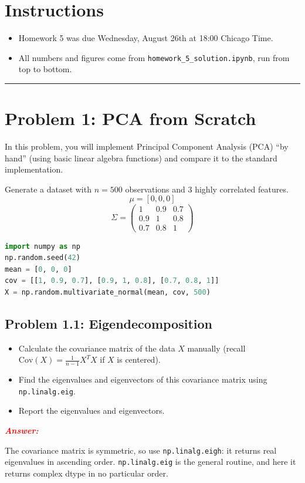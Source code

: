 \documentclass[11pt, letterpaper]{article}
\newcommand{\problem}[1]{\section*{Problem #1}}
\newcommand{\subproblem}[1]{\subsection*{Problem #1}}
\newcommand{\answer}{\textbf{\textit{\textcolor{red}{Answer:}}}}
\begin{document}
\section*{Instructions}
\begin{itemize}
    \item Homework 5 was due Wednesday, August 26th at 18:00 Chicago Time.
    \item All numbers and figures come from \texttt{homework\_5\_solution.ipynb}, run from top to bottom.
\end{itemize}
\hrule
\vspace{0.5cm}

\pagebreak

\problem{1: PCA from Scratch}

In this problem, you will implement Principal Component Analysis (PCA) ``by hand'' (using basic linear algebra functions) and compare it to the standard implementation.

Generate a dataset with $n=500$ observations and 3 highly correlated features.
$$ \mu = [0, 0, 0] $$
$$ \Sigma = \begin{pmatrix} 1 & 0.9 & 0.7 \\ 0.9 & 1 & 0.8 \\ 0.7 & 0.8 & 1 \end{pmatrix} $$

    \begin{lstlisting}[language=Python]
import numpy as np
np.random.seed(42)
mean = [0, 0, 0]
cov = [[1, 0.9, 0.7], [0.9, 1, 0.8], [0.7, 0.8, 1]]
X = np.random.multivariate_normal(mean, cov, 500)\end{lstlisting}

\subproblem{1.1: Eigendecomposition}
\begin{itemize}
    \item Calculate the covariance matrix of the data $X$ manually (recall $\text{Cov}(X) = \frac{1}{n-1}X^T X$ if $X$ is centered).
    \item Find the eigenvalues and eigenvectors of this covariance matrix using \texttt{np.linalg.eig}.
    \item Report the eigenvalues and eigenvectors.
\end{itemize}

\answer

The covariance matrix is symmetric, so use \texttt{np.linalg.eigh}: it returns real eigenvalues in
ascending order. \texttt{np.linalg.eig} is the general routine, and here it returns complex dtype in
no particular order.
\end{document}
